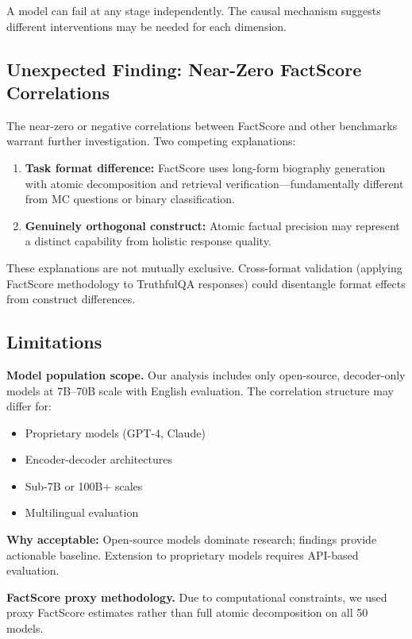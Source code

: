 A model can fail at any stage independently. The causal mechanism suggests different interventions may be needed for each dimension.

\subsection{Unexpected Finding: Near-Zero FactScore Correlations}

The near-zero or negative correlations between FactScore and other benchmarks warrant further investigation. Two competing explanations:

\begin{enumerate}
\item \textbf{Task format difference:} FactScore uses long-form biography generation with atomic decomposition and retrieval verification---fundamentally different from MC questions or binary classification.

\item \textbf{Genuinely orthogonal construct:} Atomic factual precision may represent a distinct capability from holistic response quality.
\end{enumerate}

These explanations are not mutually exclusive. Cross-format validation (applying FactScore methodology to TruthfulQA responses) could disentangle format effects from construct differences.

\subsection{Limitations}

\textbf{Model population scope.} Our analysis includes only open-source, decoder-only models at 7B--70B scale with English evaluation. The correlation structure may differ for:
\begin{itemize}
\item Proprietary models (GPT-4, Claude)
\item Encoder-decoder architectures
\item Sub-7B or 100B+ scales
\item Multilingual evaluation
\end{itemize}

\textbf{Why acceptable:} Open-source models dominate research; findings provide actionable baseline. Extension to proprietary models requires API-based evaluation.

\textbf{FactScore proxy methodology.} Due to computational constraints, we used proxy FactScore estimates rather than full atomic decomposition on all 50 models.

